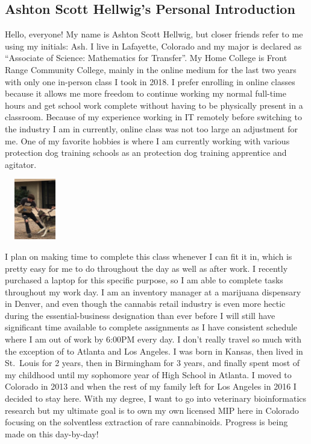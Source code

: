 \documentclass[stu,12pt]{apa7}
\begin{document}
    \newpage
    \subsection*{Ashton Scott Hellwig's Personal Introduction}
      Hello, everyone! My name is Ashton Scott Hellwig, but closer friends refer
        to me using my initials: Ash. I live in Lafayette, Colorado and my major
        is declared as ``Associate of Science: Mathematics for Transfer''. My
        Home College is Front Range Community College, mainly in the online
        medium for the last two years with only one in-person class I took in
        2018. I prefer enrolling in online classes because it allows me more
        freedom to continue working my normal full-time hours and get school
        work complete without having to be physically present in a classroom.
        Because of my experience working in IT remotely before switching to
        the industry I am in currently, online class was not too large an
        adjustment for me. One of my favorite hobbies is where I am currently
        working with various protection dog training schools as an protection
        dog training apprentice and agitator.

        \includegraphics[height=100px,width=100px]{KojackBiteWork1}

        I plan on making time to complete this class whenever I can fit it in,
        which is pretty easy for me to do throughout the day as well as after
        work. I recently purchased a laptop for this specific purpose, so I am
        able to complete tasks throughout my work day. I am an inventory manager
        at a marijuana dispensary in Denver, and even though the cannabis
        retail industry is even more hectic during the essential-business
        designation than ever before I will still have significant time
        available to complete assignments as I have consistent schedule where I
        am out of work by 6:00PM every day. I don't really travel so much with
        the exception of to Atlanta and Los Angeles. I was born in Kansas, then
        lived in St.\ Louis for 2 years, then in Birmingham for 3 years, and
        finally spent most of my childhood until my sophomore year of High
        School in Atlanta. I moved to Colorado in 2013 and when the rest of my
        family left for Los Angeles in 2016 I decided to stay here. With my
        degree, I want to go into veterinary bioinformatics research but my
        ultimate goal is to own my own licensed MIP here in Colorado focusing
        on the solventless extraction of rare cannabinoids. Progress is being
        made on this day-by-day!
\end{document}
